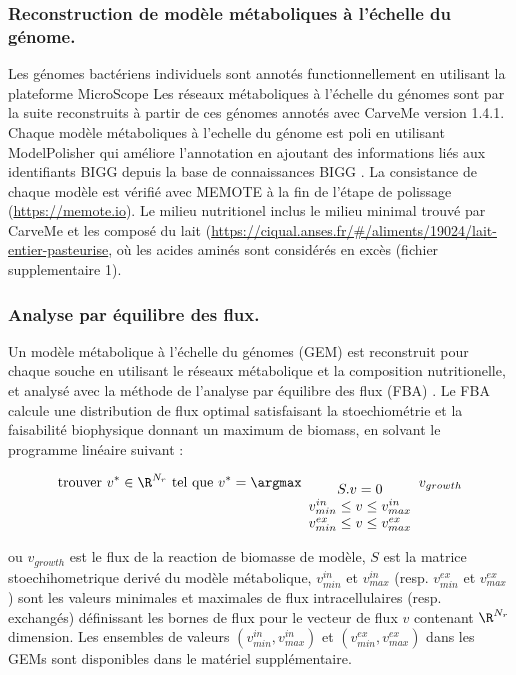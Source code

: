 \documentclass[../main.tex]{subfiles}
\begin{document}
\subsubsection{Reconstruction de modèle métaboliques à l'échelle du génome.} Les génomes bactériens individuels sont annotés functionnellement en utilisant la plateforme MicroScope \citep{Vallenet.2019} Les réseaux métaboliques à l'échelle du génomes sont par la suite reconstruits à partir de ces génomes annotés avec CarveMe \citep{Machado2018} version 1.4.1. Chaque modèle métaboliques à l'echelle du génome est poli en utilisant ModelPolisher \citep{Romer2016} qui améliore l'annotation en ajoutant des informations liés aux identifiants BIGG depuis la base de connaissances BIGG \citep{King2016}. La consistance de chaque modèle est vérifié avec MEMOTE \citep{Lieven.2020} à la fin de l'étape de polissage (\url{https://memote.io}). Le milieu nutritionel inclus le milieu minimal trouvé par CarveMe et les composé du lait (\url{https://ciqual.anses.fr/\#/aliments/19024/lait-entier-pasteurise}, où les acides aminés sont considérés en excès (fichier supplementaire 1).

\subsubsection{Analyse par équilibre des flux.} Un modèle métabolique à l'échelle du génomes (GEM) est reconstruit pour chaque souche en utilisant le réseaux métabolique et la composition nutritionelle, et analysé avec la méthode de l'analyse par équilibre des flux (FBA) \citep{Orth2010}. Le FBA calcule une distribution de flux optimal satisfaisant la stoechiométrie et la faisabilité biophysique donnant un maximum de biomass, en solvant le programme linéaire suivant : 

\begin{equation}
\label{eq:fba}
\text{trouver }v^* \in \R^{N_r} \text{ tel que }  v^*= \argmax_{\begin{array}{c} S.v=0 \\ v_{min}^{in} \leq v \leq v_{max}^{in} \\ v_{min}^{ex} \leq v \leq v_{max}^{ex}   \end{array}}   v_{growth}
\end{equation}

ou $v_{growth}$ est le flux de la reaction de biomasse de modèle, $S$ est la matrice stoechihometrique derivé du modèle métabolique, $v_{min}^{in}$  et $v_{max}^{in}$ (resp. $v_{min}^{ex}$  et $v_{max}^{ex}$) sont les valeurs minimales et maximales de flux intracellulaires (resp. exchangés) définissant les bornes de flux pour le vecteur de flux $v$ contenant $\R^{N_r}$dimension. Les ensembles de valeurs $(v_{min}^{in},v_{max}^{in})$ et $(v_{min}^{ex},v_{max}^{ex})$ dans les GEMs sont disponibles dans le matériel supplémentaire.
\end{document}
